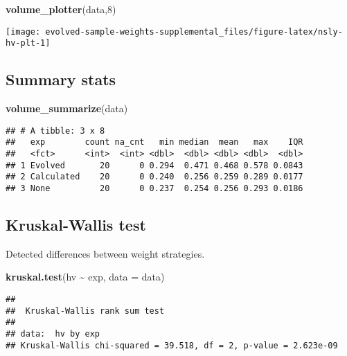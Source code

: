 \documentclass[
]{book}
\newenvironment{Shaded}{\begin{snugshade}}{\end{snugshade}}
\newcommand{\AttributeTok}[1]{\textcolor[rgb]{0.13,0.29,0.53}{#1}}
\newcommand{\DecValTok}[1]{\textcolor[rgb]{0.00,0.00,0.81}{#1}}
\newcommand{\FunctionTok}[1]{\textcolor[rgb]{0.13,0.29,0.53}{\textbf{#1}}}
\newcommand{\NormalTok}[1]{#1}
\newcommand{\SpecialCharTok}[1]{\textcolor[rgb]{0.81,0.36,0.00}{\textbf{#1}}}
\begin{document}
\begin{Shaded}
\begin{Highlighting}[]
\FunctionTok{volume\_plotter}\NormalTok{(data,}\DecValTok{8}\NormalTok{)}
\end{Highlighting}
\end{Shaded}

\texttt{[image: evolved-sample-weights-supplemental\_files/figure-latex/nsly-hv-plt-1]}

\hypertarget{summary-stats-7}{%
\subsection{Summary stats}\label{summary-stats-7}}

\begin{Shaded}
\begin{Highlighting}[]
\FunctionTok{volume\_summarize}\NormalTok{(data)}
\end{Highlighting}
\end{Shaded}

\begin{verbatim}
## # A tibble: 3 x 8
##   exp        count na_cnt   min median  mean   max    IQR
##   <fct>      <int>  <int> <dbl>  <dbl> <dbl> <dbl>  <dbl>
## 1 Evolved       20      0 0.294  0.471 0.468 0.578 0.0843
## 2 Calculated    20      0 0.240  0.256 0.259 0.289 0.0177
## 3 None          20      0 0.237  0.254 0.256 0.293 0.0186
\end{verbatim}

\hypertarget{kruskal-wallis-test-7}{%
\subsection{Kruskal-Wallis test}\label{kruskal-wallis-test-7}}

Detected differences between weight strategies.

\begin{Shaded}
\begin{Highlighting}[]
\FunctionTok{kruskal.test}\NormalTok{(hv }\SpecialCharTok{\textasciitilde{}}\NormalTok{ exp, }\AttributeTok{data =}\NormalTok{ data)}
\end{Highlighting}
\end{Shaded}

\begin{verbatim}
## 
##  Kruskal-Wallis rank sum test
## 
## data:  hv by exp
## Kruskal-Wallis chi-squared = 39.518, df = 2, p-value = 2.623e-09
\end{verbatim}
\end{document}
